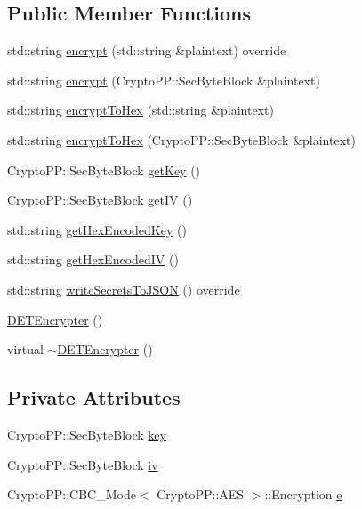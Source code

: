 \subsection*{Public Member Functions}
\begin{DoxyCompactItemize}
\item 
std\+::string \hyperlink{classDETEncrypter_a9d628bff7fe333ece3c39f3827727582}{encrypt} (std\+::string \&plaintext) override
\item 
std\+::string \hyperlink{classDETEncrypter_a0755264964442bb1593cf1ffd0bbe274}{encrypt} (Crypto\+P\+P\+::\+Sec\+Byte\+Block \&plaintext)
\item 
std\+::string \hyperlink{classDETEncrypter_ad688722b05535c623af3c32548af23c9}{encrypt\+To\+Hex} (std\+::string \&plaintext)
\item 
std\+::string \hyperlink{classDETEncrypter_a78128a4a9df72a4199abbd06f6169c48}{encrypt\+To\+Hex} (Crypto\+P\+P\+::\+Sec\+Byte\+Block \&plaintext)
\item 
Crypto\+P\+P\+::\+Sec\+Byte\+Block \hyperlink{classDETEncrypter_aa8b1e2a9a97067e338eaf5f4b6093db9}{get\+Key} ()
\item 
Crypto\+P\+P\+::\+Sec\+Byte\+Block \hyperlink{classDETEncrypter_a78968a6f219de6c9d08989898d954e30}{get\+IV} ()
\item 
std\+::string \hyperlink{classDETEncrypter_a79402704553f39cc751cc60c5ace53df}{get\+Hex\+Encoded\+Key} ()
\item 
std\+::string \hyperlink{classDETEncrypter_adebcf0d8c18e5b994a8f6cc3e29edff6}{get\+Hex\+Encoded\+IV} ()
\item 
std\+::string \hyperlink{classDETEncrypter_a30ffe8f94a95f723e62d0b1a1ed8dc56}{write\+Secrets\+To\+J\+S\+ON} () override
\item 
\hyperlink{classDETEncrypter_a11abdce8bc5cda79b1d3f20b940a99d1}{D\+E\+T\+Encrypter} ()
\item 
virtual \hyperlink{classDETEncrypter_a02972763cd6466853004306f8e47c57d}{$\sim$\+D\+E\+T\+Encrypter} ()
\end{DoxyCompactItemize}
\subsection*{Private Attributes}
\begin{DoxyCompactItemize}
\item 
Crypto\+P\+P\+::\+Sec\+Byte\+Block \hyperlink{classDETEncrypter_a698a78e4f1fb49cf02a005ee7bce6a99}{key}
\item 
Crypto\+P\+P\+::\+Sec\+Byte\+Block \hyperlink{classDETEncrypter_a40e99abf751fa9c802b3a4cc9c6796a0}{iv}
\item 
Crypto\+P\+P\+::\+C\+B\+C\+\_\+\+Mode$<$ Crypto\+P\+P\+::\+A\+ES $>$\+::Encryption \hyperlink{classDETEncrypter_a29875af9a8c1df01802d11f0a00f5f90}{e}
\end{DoxyCompactItemize}


